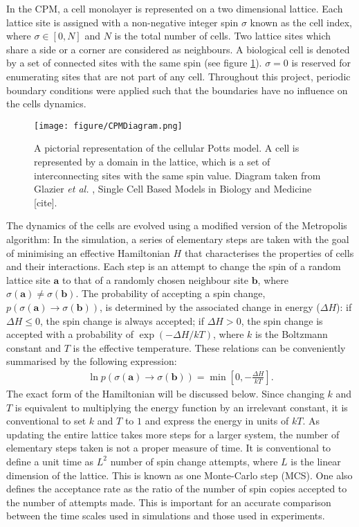 \documentclass[a4paper,12pt]{article}
\newcommand{\inc}{\Delta}
\newcommand{\etal}{\emph{et al. }}
\begin{document}
In the CPM, a cell monolayer is represented on a two dimensional lattice. Each lattice site is assigned with a non-negative integer spin $\sigma$ known as the cell index, where $\sigma \in [0,N]$ and $N$ is the total number of cells. Two lattice sites which share a side or a corner are considered as neighbours. A biological cell is denoted by a set of connected sites with the same spin (see figure \ref{fig:CPM}). $\sigma = 0$ is reserved for enumerating sites that are not part of any cell. Throughout this project, periodic boundary conditions were applied such that the boundaries have no influence on the cells dynamics.

\begin{figure}[h]
\centering
\texttt{[image: figure/CPMDiagram.png]}
\caption{A pictorial representation of the cellular Potts model. A cell is represented by a domain in the lattice, which is a set of interconnecting sites with the same spin value. Diagram taken from Glazier \etal, Single Cell Based Models in Biology and Medicine [cite].}
\label{fig:CPM}
\end{figure}

The dynamics of the cells are evolved using a modified version of the Metropolis algorithm: In the simulation, a series of elementary steps are taken with the goal of minimising an effective Hamiltonian $H$ that characterises the properties of cells and their interactions. Each step is an attempt to change the spin of a random lattice site $\bm{a}$ to that of a randomly chosen neighbour site $\bm{b}$, where $\sigma(\bm{a}) \neq \sigma(\bm{b})$. The probability of accepting a spin change, $p\left(\sigma(\bm{a}) \rightarrow \sigma(\bm{b})\right)$, is determined by the associated change in energy ($\inc H$): if $\inc H \leq 0$, the spin change is always accepted; if $\inc H > 0$, the spin change is accepted with a probability of $\exp(-\inc H / kT)$, where $k$ is the Boltzmann constant and $T$ is the effective temperature. These relations can be conveniently summarised by the following expression:
\begin{eqnarray}
\ln p\left(\sigma(\bm{a}) \rightarrow \sigma(\bm{b})\right) = \min\left[0,-\frac{\inc H}{kT}\right].
\end{eqnarray}
The exact form of the Hamiltonian will be discussed below. Since changing $k$ and $T$ is equivalent to multiplying the energy function by an irrelevant constant, it is conventional to set $k$ and $T$ to $1$ and express the energy in units of $kT$. As updating the entire lattice takes more steps for a larger system, the number of elementary steps taken is not a proper measure of time. It is conventional to define a unit time as $L^2$ number of spin change attempts, where $L$ is the linear dimension of the lattice. This is known as one Monte-Carlo step (MCS). One also defines the acceptance rate as the ratio of the number of spin copies accepted to the number of attempts made. This is important for an accurate comparison between the time scales used in simulations and those used in experiments\cite{sanz2010}.
\end{document}
